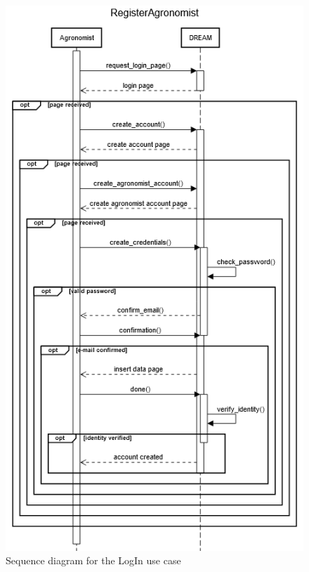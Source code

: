 \documentclass{article}
\begin{document}
\begin{figure}[H]
    \centering
    \includegraphics[scale=0.60]{sequence_diagrams/RegisterAgronomist}
    \caption{Sequence diagram for the LogIn use case}
\end{figure}

\end{document}
